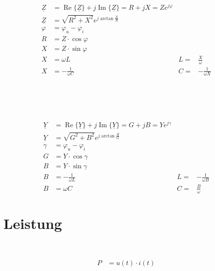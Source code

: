 \begin{boxleft}
\\
\\
\end{boxleft}\begin{boxrightshaded}
\begin{align*}
\underline{Z}&=\operatorname{Re}\{\underline{Z}\}+j\operatorname{Im}\{\underline{Z}\}=R+jX=Ze^{j\varphi}\\
\underline{Z}&=\sqrt{R^2+X^2}e^{j\arctan\frac{X}{R}}\\
\varphi&=\varphi_u-\varphi_i\\
R&=Z\cdot\cos \varphi\\
X&=Z\cdot\sin \varphi\\
X&=\omega L&L=&\frac{X}{\omega}\\
X&=-\frac{1}{\omega C}&C=&-\frac{1}{\omega X}
\end{align*}
\end{boxrightshaded}

\begin{boxleft}
\\
\\
\\
\end{boxleft}\begin{boxrightshaded}
\begin{align*}
\underline{Y}&=\operatorname{Re}\{\underline{Y}\}+j\operatorname{Im}\{\underline{Y}\}=G+jB=Ye^{j\gamma}\\
\underline{Y}&=\sqrt{G^2+B^2}e^{j\arctan\frac{B}{G}}\\
\gamma&=\varphi_u-\varphi_i\\
G&=Y\cdot\cos \gamma\\
B&=Y\cdot\sin \gamma\\
B&=-\frac{1}{\omega L}&L=&-\frac{1}{\omega B}\\
B&=\omega C&C=&\frac{B}{\omega}
\end{align*}
\end{boxrightshaded}


\section{Leistung}

\begin{boxleft}
\\
\end{boxleft}\begin{boxrightshaded}
\begin{align*}
P&=u(t)\cdot i(t)
\end{align*}
\end{boxrightshaded}

